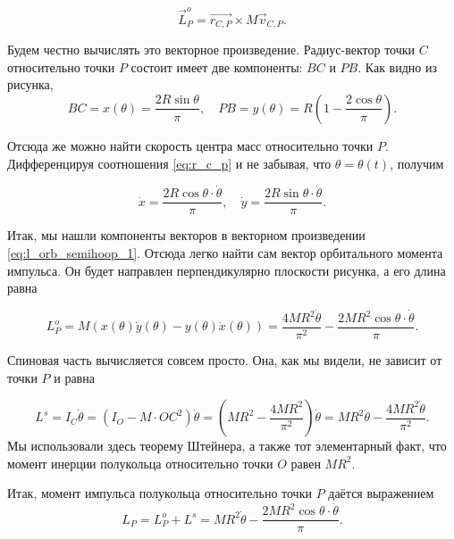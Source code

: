 \documentclass[a4paper,12pt]{article}
\begin{document}
\begin{equation}
  \label{eq:l_orb_semihoop_1}
  \vec{L}_{P}^{o} = \vec{r_{C,P}} \times M \vec{v}_{C,P}. 
\end{equation}

Будем честно вычислять это векторное произведение. Радиус-вектор точки
$C$ относительно точки $P$ состоит имеет две компоненты: $BC$ и
$PB$. Как видно из рисунка,
\begin{equation}
  \label{eq:r_c_p}
  BC = x(\theta) = \frac{2R\sin \theta}{\pi}, \quad PB
  = y (\theta) = R \left( 1 - \frac{2\cos \theta}{\pi} \right).
\end{equation}

Отсюда же можно найти скорость центра масс относительно точки
$P$. Дифференцируя соотношения \eqref{eq:r_c_p} и не забывая, что
$\theta = \theta (t)$, получим

\begin{equation}
  \label{eq:v_c_p}
  \dot {x} = \frac{2R \cos \theta \cdot \dot{\theta} }{\pi}, \quad
  \dot{y} = \frac{2R \sin \theta \cdot \dot{\theta} }{\pi}.
\end{equation}

Итак, мы нашли компоненты векторов в векторном произведении
\eqref{eq:l_orb_semihoop_1}. Отсюда легко найти сам вектор
орбитального момента импульса. Он будет направлен перпендикулярно
плоскости рисунка, а его длина равна

\begin{equation}
  \label{eq:l_orb_semihoop_2}
  L_P^o = M \left( x(\theta) \dot{y} (\theta) - y(\theta) \dot{x}
    (\theta)  \right)  = 
  \frac{4MR^2 \dot{\theta}}{\pi^2} - \frac{2MR^2 \cos \theta
    \cdot \dot{\theta}}{\pi}. 
\end{equation}

Спиновая часть вычисляется совсем просто. Она, как мы видели, не
зависит от точки $P$ и равна 

\begin{equation}
  \label{eq:l_spin_semihoop_1}
  L^s = I_C \dot{\theta} = \left( I_O - M \cdot OC^2 \right) \dot
  {\theta} = \left( MR^2 - \frac{4MR^2}{\pi^2} \right) \dot{\theta} =
  MR^2 \dot{\theta} - \frac{4MR^2 \dot{\theta}}{\pi^2}. 
\end{equation}
Мы использовали здесь теорему Штейнера, а также тот элементарный факт,
что момент инерции полукольца относительно точки $O$ равен $MR^2$. 

Итак, момент импульса полукольца относительно точки $P$ даётся
выражением
\begin{equation}
  \label{eq:l_full_semihoop}
  L_P = L_P^o + L^s = MR^2 \dot{\theta} - \frac{2MR^2 \cos \theta
    \cdot \dot{\theta}}{\pi}.
\end{equation}
\end{document}
